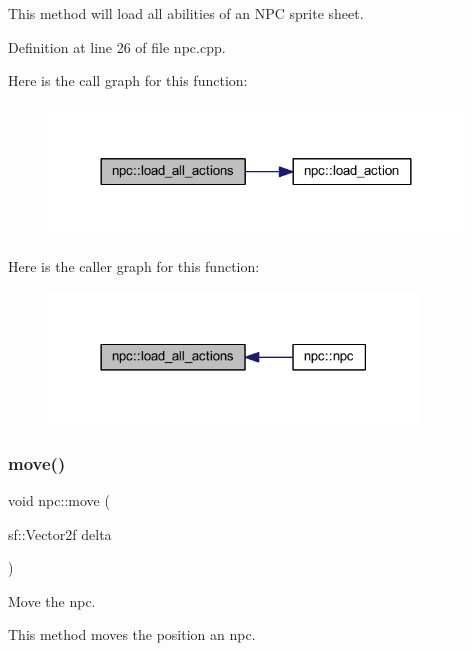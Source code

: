 This method will load all abilities of an N\+PC sprite sheet.~\newline


Definition at line 26 of file npc.\+cpp.

Here is the call graph for this function\+:
\nopagebreak
\begin{figure}[H]
\begin{center}
\leavevmode
\includegraphics[width=312pt]{classnpc_a357fc1c053fb6fe0e09c03d72f63191a_cgraph}
\end{center}
\end{figure}
Here is the caller graph for this function\+:
\nopagebreak
\begin{figure}[H]
\begin{center}
\leavevmode
\includegraphics[width=278pt]{classnpc_a357fc1c053fb6fe0e09c03d72f63191a_icgraph}
\end{center}
\end{figure}
\mbox{\label{classnpc_ae8d1bfcd87382237192ebb5b6def33a5}} 
\subsubsection{\texorpdfstring{move()}{move()}}
{\footnotesize\ttfamily void npc\+::move (\begin{DoxyParamCaption}\item[{sf\+::\+Vector2f}]{delta }\end{DoxyParamCaption})}



Move the npc. 

This method moves the position an npc.~\newline



